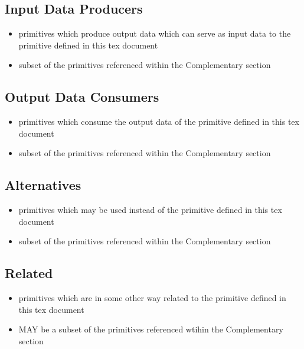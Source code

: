 \documentclass[../../main.tex]{subfiles}
\begin{document}
\subsection{Input Data Producers}

\begin{itemize}

\item primitives which produce output data which can serve as input data to the primitive defined in this tex document

\item subset of the primitives referenced within the Complementary section

\end{itemize}

\subsection{Output Data Consumers}

\begin{itemize}

\item primitives which consume the output data of the primitive defined in this tex document

\item subset of the primitives referenced within the Complementary section

\end{itemize}

\subsection{Alternatives}

\begin{itemize}

\item primitives which may be used instead of the primitive defined in this tex document

\item subset of the primitives referenced within the Complementary section

\end{itemize}

\subsection{Related}

\begin{itemize}

\item primitives which are in some other way related to the primitive defined in this tex document

\item MAY be a subset of the primitives referenced wtihin the Complementary section

\end{itemize}
\end{document}
